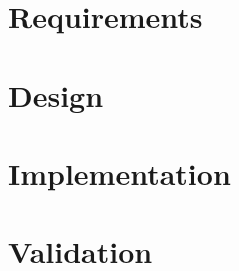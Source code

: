 \documentclass[12pt,a4paper,openright,twoside]{book}
\begin{document}
\chapter{Requirements} 
\label{chap:requirements}


\chapter{Design} 
\label{chap:design}


\chapter{Implementation} 
\label{chap:implementation}


\chapter{Validation} %
\label{chap:validation}


\chapter{\conclusionsname}
\label{chap:conclusions}





\end{document}
